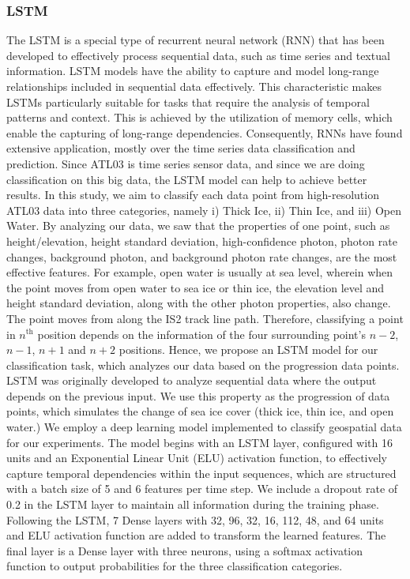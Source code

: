 \subsubsection{LSTM}
The LSTM \cite{hochreiter1997long} is a special type of recurrent neural network (RNN) that has been developed to effectively process sequential data, such as time series 
and textual information. LSTM models have the ability to capture and model long-range relationships included in sequential data effectively. This characteristic makes LSTMs particularly suitable for tasks that require the analysis of temporal patterns and context. 
This is achieved by the utilization of memory cells, which enable the capturing of long-range dependencies. Consequently, RNNs have found extensive application, mostly over the time series data classification and prediction. Since ATL03 is time series sensor data, and since we are doing classification on this big data, the LSTM model can help to achieve better results. 
In this study, we aim to classify each data point from high-resolution ATL03 data into three categories, namely i) Thick Ice, ii) Thin Ice, and iii) Open Water. By analyzing our data, we saw that the properties of one point, such as height/elevation, height standard deviation, high-confidence photon, photon rate changes, background photon, and background photon rate changes, are the most effective features. For example, open water is usually at sea level, wherein when the point moves from open water to sea ice or thin ice, the elevation level and height standard deviation, along with the other photon properties, also change. The point moves from along the IS2 track line path. Therefore, classifying a point in $n^{\text{th}}$ position depends on the information of the four surrounding point's $n-2$, $n-1$, $n+1$ and $n+2$ positions. Hence, we propose an LSTM \cite{hochreiter1997long} model for our classification task, which analyzes our data based on the progression data points. LSTM was originally developed to analyze sequential data where the output depends on the previous input. We use this property as the progression of data points, which simulates the change of sea ice cover (thick ice, thin ice, and open water.)
We employ a deep learning model implemented to classify geospatial data for our experiments.
The model begins with an LSTM layer, configured with 16 units and an Exponential Linear Unit (ELU) activation function, to effectively capture temporal dependencies within the input sequences, which are structured with a batch size of 5 and 6 features per time step. We include a dropout rate of 0.2 in the LSTM layer to maintain all information during the training phase. Following the LSTM, 7 Dense layers with 32, 96, 32, 16, 112, 48, and 64 units and ELU activation function are added to transform the learned features. The final layer is a Dense layer with three neurons, using a softmax activation function to output probabilities for the three classification categories. 
